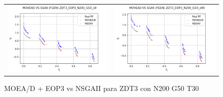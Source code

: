 \begin{figure}[H]
\begin{tabular}{c c}
    \includegraphics[scale=0.5]{figures/ZDT3_EOP3_N200_G50_T30/s9_comp.png} &
    \includegraphics[scale=0.5]{figures/ZDT3_EOP3_N200_G50_T30/s99_comp.png}\\
    \end{tabular}
    \caption{\centering MOEA/D + EOP3 vs NSGAII para ZDT3 con N200 G50 T30}
    \label{fig:7}
\end{figure}

